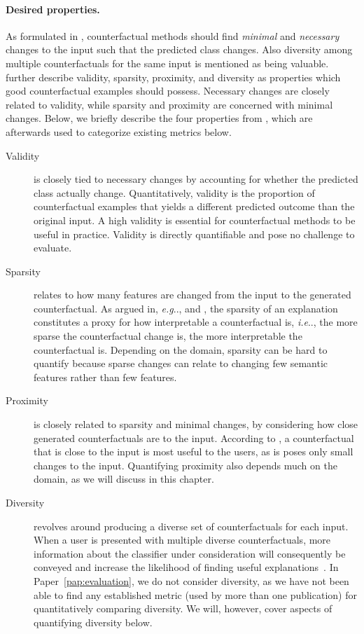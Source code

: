 \documentclass[11pt,a4paper,twoside,openright,final]{memoir}
\makeatletter
\DeclareRobustCommand\onedot{\futurelet\@let@token\@onedot}
\def\@onedot{\ifx\@let@token.\else.\null\fi\xspace}
\def\eg{\emph{e.g}\onedot} \def\Eg{\emph{E.g}\onedot}
\def\ie{\emph{i.e}\onedot} \def\Ie{\emph{I.e}\onedot}
\newcommand*{\paperref}[1]{Paper~\hyperref[#1]{\ref{#1}}}
\makeatother
\begin{document}
\paragraph{Desired properties.}
As formulated in \citet{Wachter2017}, counterfactual methods should find \emph{minimal} and \emph{necessary} changes to the input such that the predicted class changes.
Also diversity among multiple counterfactuals for the same input is mentioned as being valuable.
\citet{Mothilal2020} further describe validity, sparsity, proximity, and diversity as properties which good counterfactual examples should possess.
Necessary changes are closely related to validity, while sparsity and proximity are concerned with minimal changes. 
Below, we briefly describe the four properties from \cite{Mothilal2020}, which are afterwards used to categorize existing metrics below.

\begin{description} 
    \item[Validity] is closely tied to necessary changes by accounting for whether the predicted class actually change. 
    Quantitatively, validity is the proportion of counterfactual examples that yields a different predicted outcome than the original input.
    A high validity is essential for counterfactual methods to be useful in practice.
    Validity is directly quantifiable and pose no challenge to evaluate.
    
    \item[Sparsity] relates to how many features are changed from the input to the generated counterfactual.
    As argued in, \eg, \cite{Wachter2017} and \cite{Grath2018}, the sparsity of an explanation constitutes a proxy for how interpretable a counterfactual is, \ie, the more sparse the counterfactual change is, the more interpretable the counterfactual is. 
    Depending on the domain, sparsity can be hard to quantify because sparse changes can relate to changing few semantic features rather than few features.
    
    \item[Proximity] is closely related to sparsity and minimal changes, by considering how close generated counterfactuals are to the input.
    According to \cite{Mothilal2020}, a counterfactual that is close to the input is most useful to the users, as is poses only small changes to the input.
    Quantifying proximity also depends much on the domain, as we will discuss in this chapter. 
    
    \item[Diversity] revolves around producing a diverse set of counterfactuals for each input.
    When a user is presented with multiple diverse counterfactuals, more information about the classifier under consideration will consequently be conveyed and increase the likelihood of finding useful explanations~\cite{Rodriguez2021}.
    In \paperref{pap:evaluation}, we do not consider diversity, as we have not been able to find any established metric (used by more than one publication) for quantitatively comparing diversity.
    We will, however, cover aspects of quantifying diversity below.
\end{description}
\end{document}

